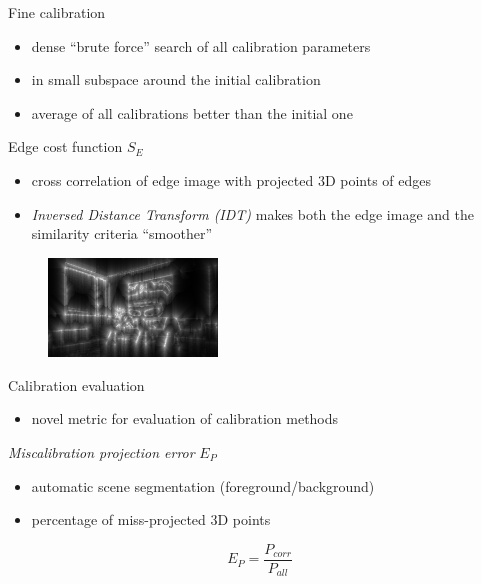 \documentclass[pdf]{beamer}
\begin{document}
	\begin{frame}{Fine calibration}

		\begin{itemize}
			\item dense ``brute force'' search of all calibration parameters
			\item in small subspace around the initial calibration 
			\item average of all calibrations better than the initial one
		\end{itemize}

		\begin{block}{Edge cost function $S_E$}
			\begin{itemize}
				\item cross correlation of edge image with projected $3$D points of edges
				\item \emph{Inversed Distance Transform (IDT)} makes both the edge image and the similarity criteria ``smoother''
			\end{itemize}
		\end{block}

		\begin{figure}[h]
			\center
			\includegraphics[width=0.4\textwidth]{fig/edges_idt.png}
		\end{figure}

	\end{frame}	

	\begin{frame}{Calibration evaluation}
		\begin{itemize}
			\item novel metric for evaluation of calibration methods
		\end{itemize}
		
		\begin{block}{\emph{Miscalibration projection error} $E_P$}
			\begin{itemize}
				\item automatic scene segmentation (foreground/background)
				\item percentage of miss-projected $3$D points
			\end{itemize}
		\end{block}
		
		\begin{equation}
			E_P = \dfrac{P_{corr}}{P_{all}}
		\end{equation}
	\end{frame}
	
\end{document}
